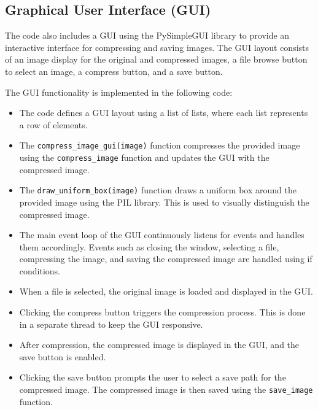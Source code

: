 \documentclass{article}
\begin{document}
\subsection{Graphical User Interface (GUI)}

The code also includes a GUI using the PySimpleGUI library to provide an interactive interface for compressing and saving images. The GUI layout consists of an image display for the original and compressed images, a file browse button to select an image, a compress button, and a save button.

The GUI functionality is implemented in the following code:

\begin{itemize}
    \item The code defines a GUI layout using a list of lists, where each list represents a row of elements.

    \item The \texttt{compress\_image\_gui(image)} function compresses the provided image using the \texttt{compress\_image} function and updates the GUI with the compressed image.

    \item The \texttt{draw\_uniform\_box(image)} function draws a uniform box around the provided image using the PIL library. This is used to visually distinguish the compressed image.

    \item The main event loop of the GUI continuously listens for events and handles them accordingly. Events such as closing the window, selecting a file, compressing the image, and saving the compressed image are handled using if conditions.

    \item When a file is selected, the original image is loaded and displayed in the GUI.

    \item Clicking the compress button triggers the compression process. This is done in a separate thread to keep the GUI responsive.

    \item After compression, the compressed image is displayed in the GUI, and the save button is enabled.

    \item Clicking the save button prompts the user to select a save path for the compressed image. The compressed image is then saved using the \texttt{save\_image} function.

\end{itemize}
\end{document}
